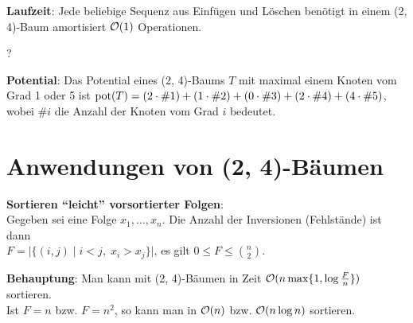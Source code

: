 \textbf{Laufzeit}:
Jede beliebige Sequenz aus Einfügen und Löschen benötigt in einem
(2, 4)-Baum amortisiert $\mathcal{O}(1)$ Operationen.

\begin{Beweis}
    ?
\end{Beweis}

\textbf{Potential}:
Das Potential eines (2, 4)-Baums $T$ mit maximal einem Knoten vom Grad 1 oder 5
ist $\operatorname{pot}(T) = (2 \cdot \#1) + (1 \cdot \#2) + (0 \cdot \#3) + (2 \cdot \#4) +
(4 \cdot \#5)$, wobei
$\#i$ die Anzahl der Knoten vom Grad $i$ bedeutet.

\pagebreak

\section{%
    Anwendungen von (2, 4)-Bäumen%
}

\textbf{Sortieren "`leicht"' vorsortierter Folgen}: \\
Gegeben sei eine Folge $x_1, \dotsc, x_n$.
Die Anzahl der Inversionen (Fehlstände) ist dann \\
$F = \Big|\big\{(i, j) \;|\; i < j,\; x_i > x_j\big\}\Big|$,
es gilt $0 \le F \le \binom{n}{2}$.

\textbf{Behauptung}: Man kann mit (2, 4)-Bäumen in
Zeit $\mathcal{O}(n \max\{1, \log \frac{F}{n}\})$ sortieren. \\
Ist $F = n$ bzw. $F = n^2$, so kann man in $\mathcal{O}(n)$ bzw. $\mathcal{O}(n \log n)$
sortieren.

